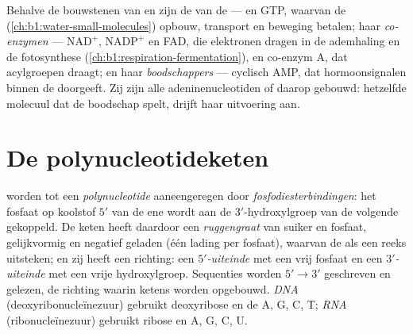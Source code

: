 \begin{proposition}\label{prop:b1:nucleic-acids:threejobs}
Behalve de bouwstenen van  en  zijn  de \emph{} van
de  ---  en GTP, waarvan de 
(\cref{ch:b1:water-small-molecules}) opbouw, transport en beweging betalen; haar
\emph{co-enzymen} --- $\mathrm{NAD^+}$, $\mathrm{NADP^+}$ en FAD, die elektronen
dragen in de ademhaling en de fotosynthese
(\cref{ch:b1:respiration-fermentation}), en co-enzym A, dat acylgroepen draagt;
en haar \emph{boodschappers} --- cyclisch AMP, dat hormoonsignalen binnen de 
doorgeeft. Zij zijn alle adeninenucleotiden of daarop gebouwd: hetzelfde molecuul
dat de boodschap spelt, drijft haar uitvoering aan.
\end{proposition}

\section{De polynucleotideketen}

\begin{definition}\label{def:b1:nucleic-acids:chain}
 worden tot een \emph{polynucleotide}
aaneengeregen door \emph{fosfodiesterbindingen}: het
fosfaat op koolstof $5'$ van de ene  wordt aan de $3'$-hydroxylgroep van
de volgende gekoppeld. De keten heeft daardoor een \emph{ruggengraat} van suiker
en fosfaat, gelijkvormig en negatief geladen (één lading per fosfaat), waarvan de
 als een reeks uitsteken; en zij heeft een richting: een \emph{$5'$-uiteinde}
met een vrij fosfaat en een \emph{$3'$-uiteinde} met een
vrije hydroxylgroep. Sequenties worden $5' \to 3'$ geschreven en gelezen, de
richting waarin ketens worden opgebouwd. \emph{DNA} (deoxyribonucleïnezuur)
gebruikt deoxyribose en de  A, G, C, T; \emph{RNA}
(ribonucleïnezuur) gebruikt ribose en A, G, C, U.
\end{definition}

